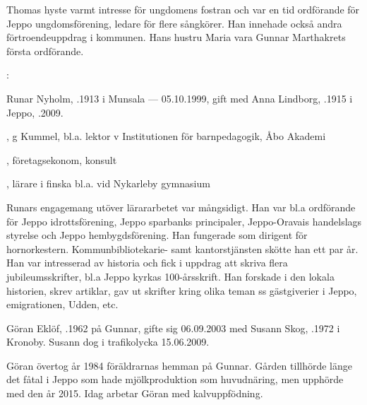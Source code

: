 Thomas hyste varmt intresse för ungdomens fostran och var en tid ordförande för Jeppo ungdomsförening, ledare för flere sångkörer. Han innehade också andra förtroendeuppdrag i kommunen. Hans hustru Maria vara Gunnar Marthakrets första ordförande.

:

Runar Nyholm, .1913 i Munsala --- 05.10.1999, gift med Anna Lindborg, .1915 i Jeppo, .2009.
\begin{jhchildren}
  \item {}, g Kummel, bl.a. lektor v Institutionen för barnpedagogik, Åbo Akademi
  \item {}, företagsekonom, konsult
  \item {}, lärare i finska bl.a. vid Nykarleby gymnasium
\end{jhchildren}

Runars engagemang utöver lärararbetet var mångsidigt. Han var bl.a ordförande för  Jeppo idrottsförening, Jeppo sparbanks principaler, Jeppo-Oravais handelslags styrelse och Jeppo hembygdsförening. Han fungerade som dirigent för hornorkestern. Kommunbibliotekarie- samt kantorstjänsten skötte han ett par år. Han var intresserad av historia och fick i uppdrag att skriva flera jubileumsskrifter, bl.a Jeppo kyrkas 100-årsskrift. Han forskade i den lokala historien, skrev artiklar, gav ut skrifter kring olika teman ss gästgiverier i Jeppo, emigrationen, Udden, etc.






Göran Eklöf, .1962 på Gunnar, gifte sig 06.09.2003 med Susann Skog, .1972 i Kronoby. Susann dog i trafikolycka 15.06.2009.
\begin{jhchildren}
  \item {}
  \item {}
\end{jhchildren}

Göran övertog år 1984  föräldrarnas hemman på Gunnar. Gården tillhörde länge det fåtal i Jeppo som hade mjölkproduktion som huvudnäring, men upphörde med den år 2015. Idag arbetar Göran med kalvuppfödning.


